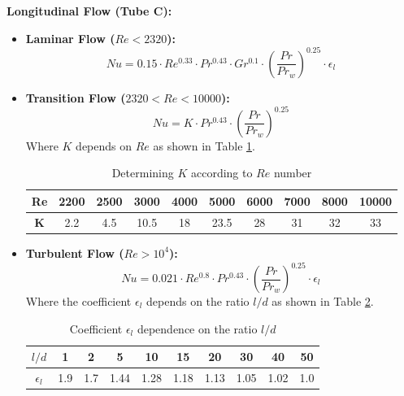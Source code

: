\textbf{Longitudinal Flow (Tube C):}
\begin{itemize}
    \item \textbf{Laminar Flow ($Re < 2320$):}
    \begin{equation}
        Nu = 0.15 \cdot Re^{0.33} \cdot Pr^{0.43} \cdot Gr^{0.1} \cdot \left(\frac{Pr}{Pr_w}\right)^{0.25} \cdot \epsilon_l
    \end{equation}
    \item \textbf{Transition Flow ($2320 < Re < 10000$):}
    \begin{equation}
        Nu = K \cdot Pr^{0.43} \cdot \left(\frac{Pr}{Pr_w}\right)^{0.25}
    \end{equation}
    Where $K$ depends on $Re$ as shown in Table \ref{tab:re-k-correlation}.

    \begin{table}[H]
        \centering
        \caption{Determining $K$ according to $Re$ number}
        \label{tab:re-k-correlation}
        \begin{tabular}{|c|c|c|c|c|c|c|c|c|c|}
            \hline
            \textbf{Re} & 2200 & 2500 & 3000 & 4000 & 5000 & 6000 & 7000 & 8000 & 10000 \\ \hline
            \textbf{K}  & 2.2  & 4.5  & 10.5 & 18   & 23.5 & 28   & 31   & 32   & 33    \\ \hline
        \end{tabular}
    \end{table}

    \item \textbf{Turbulent Flow ($Re > 10^4$):}
    \begin{equation}
        Nu = 0.021 \cdot Re^{0.8} \cdot Pr^{0.43} \cdot \left(\frac{Pr}{Pr_w}\right)^{0.25} \cdot \epsilon_l
    \end{equation}
    Where the coefficient $\epsilon_l$ depends on the ratio $l/d$ as shown in Table \ref{tab:ld-epsilon}.

    \begin{table}[H]
        \centering
        \caption{Coefficient $\epsilon_l$ dependence on the ratio $l/d$}
        \label{tab:ld-epsilon}
        \begin{tabular}{|c|c|c|c|c|c|c|c|c|c|}
            \hline
            \textbf{$l/d$}       & 1   & 2   & 5    & 10   & 15   & 20   & 30   & 40   & 50  \\ \hline
            \textbf{$\epsilon_l$} & 1.9 & 1.7 & 1.44 & 1.28 & 1.18 & 1.13 & 1.05 & 1.02 & 1.0 \\ \hline
        \end{tabular}
    \end{table}
\end{itemize}

